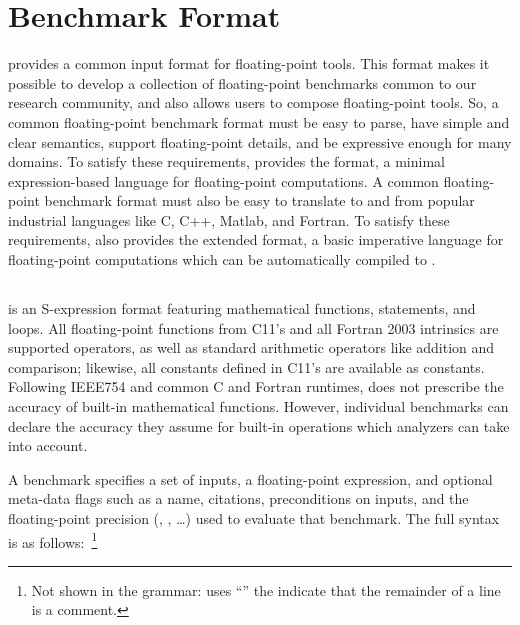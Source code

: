 \documentclass[main.tex]{subfiles}
\begin{document}
\section{Benchmark Format}
\label{sec:format}

\name provides a common input format for floating-point tools.
This format makes it possible to develop
  a collection of floating-point benchmarks
  common to our research community,
  and also allows users to compose floating-point tools.
So, a common floating-point benchmark format must be
  easy to parse,
  have simple and clear semantics,
  support floating-point details, and
  be expressive enough for many domains.
To satisfy these requirements,
  \name provides the \core format,
  a minimal expression-based language
  for floating-point computations.
A common floating-point benchmark format
  must also be easy to translate to and from
  popular industrial languages like C, C++, Matlab, and Fortran.
To satisfy these requirements,
  \name also provides the extended \surface format,
  a basic imperative language for floating-point computations
  which can be automatically compiled to \core.

\subsection{\core}

\core is an S-expression format featuring
  mathematical functions,  statements, and  loops.
All floating-point functions
  from C11's  and all Fortran 2003 intrinsics
  are supported operators,
  as well as standard arithmetic operators like addition and comparison;
  likewise, all constants defined in C11's  are available as constants.
Following IEEE754 and common C and Fortran runtimes,
  \core does not prescribe the accuracy of built-in
  mathematical functions.
However, individual benchmarks can declare the accuracy
  they assume for built-in operations which
  analyzers can take into account.


A \core benchmark specifies a set of inputs,
  a floating-point expression,
  and optional meta-data flags such as
  a name, citations, preconditions on inputs,
  and the floating-point precision
  (, , \ldots)
  used to evaluate that benchmark.
The full \core syntax is as follows:~\footnote{
Not shown in the grammar:
  \name uses ``\C{;}'' the indicate that
  the remainder of a line is a comment.}
\end{document}
